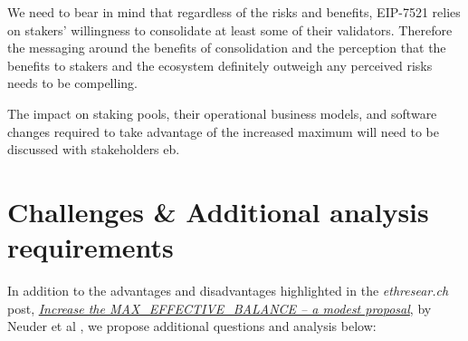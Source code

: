 \documentclass[UTF8]{article}
\begin{document}
We need to bear in mind that regardless of the risks and benefits, EIP-7521 relies on stakers' willingness to consolidate at least some of their validators. Therefore the messaging around the benefits of consolidation and the perception that the benefits to stakers and the ecosystem definitely outweigh any perceived risks needs to be compelling.

The impact on staking pools, their operational business models, and software changes required to take advantage of the increased maximum will need to be discussed with stakeholders \gls{eb}.


\section{Challenges \& Additional analysis requirements}
\label{sec:challenges}
In addition to the advantages and disadvantages highlighted in the \textit{ethresear.ch} post, \href{https://ethresear.ch/t/increase-the-max-effective-balance-a-modest-proposal/15801/3}{\textit{Increase the MAX\_EFFECTIVE\_BALANCE – a modest proposal}}, by  Neuder et al  \cite{Neuder2023a}, we propose additional questions and analysis below:
\end{document}
